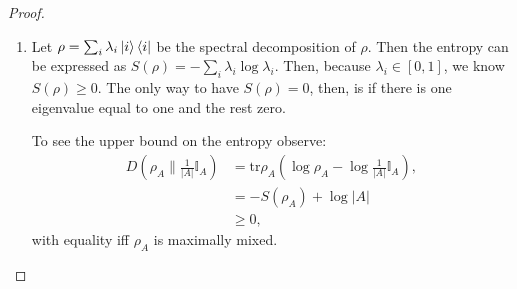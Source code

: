 \documentclass[notoc]{tufte-book}
\begin{document}
\begin{proof}
\begin{enumerate}
    \item Let $\rho = \sum_i \lambda_i \ket{i}\bra{i}$ be the spectral decomposition of $\rho$. Then the entropy can be expressed as $S(\rho)=-\sum_i \lambda_i \log{\lambda_i}$. Then, because $\lambda_i \in [0,1]$, we know $S(\rho)\geq 0$. The only way to have $S(\rho)=0$, then, is if there is one eigenvalue equal to one and the rest zero.  
    
    To see the upper bound on the entropy observe:
    \begin{align}
        D(\rho_A \| \frac{1}{|A|} \mathbb{I}_A) &= \text{tr}\rho_A(\log{\rho_A}-\log{\frac{1}{|A|}\mathbb{I}_A}),\\
        &=-S(\rho_A) + \log{|A|}\\
        &\geq 0,
    \end{align}
    with equality iff $\rho_A$ is maximally mixed.
    

\end{enumerate}
\end{proof}
\end{document}
